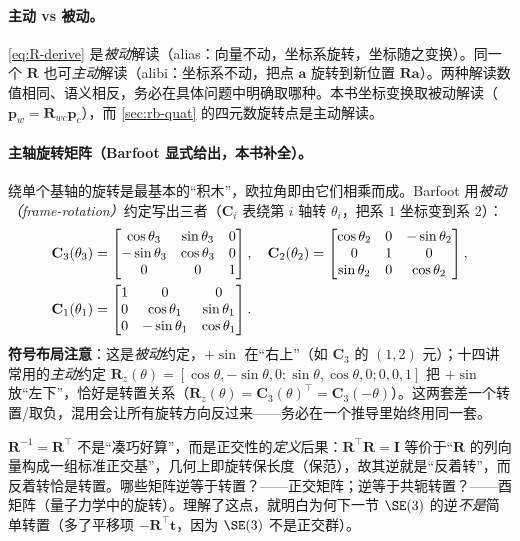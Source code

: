 \paragraph{主动 vs 被动。}\cref{eq:R-derive} 是\emph{被动}解读（alias：向量不动，坐标系旋转，坐标随之变换）。同一个 $\mathbf{R}$ 也可\emph{主动}解读（alibi：坐标系不动，把点 $\mathbf{a}$ 旋转到新位置 $\mathbf{R}\mathbf{a}$）。两种解读数值相同、语义相反，务必在具体问题中明确取哪种。本书坐标变换取被动解读（$\mathbf{p}_w=\mathbf{R}_{wc}\mathbf{p}_c$），而 \cref{sec:rb-quat} 的四元数旋转点是主动解读。

\paragraph{主轴旋转矩阵（Barfoot 显式给出，本书补全）。}绕单个基轴的旋转是最基本的“积木”，欧拉角即由它们相乘而成。Barfoot 用\emph{被动（frame-rotation）}约定写出三者\cite{barfoot2024state}（$\mathbf{C}_i$ 表绕第 $i$ 轴转 $\theta_i$，把系 $1$ 坐标变到系 $2$）：
\begin{align}
  \mathbf{C}_3(\theta_3)&=\begin{bmatrix}\cos\theta_3&\sin\theta_3&0\\-\sin\theta_3&\cos\theta_3&0\\0&0&1\end{bmatrix},\quad
  \mathbf{C}_2(\theta_2)=\begin{bmatrix}\cos\theta_2&0&-\sin\theta_2\\0&1&0\\\sin\theta_2&0&\cos\theta_2\end{bmatrix},\notag\\
  \mathbf{C}_1(\theta_1)&=\begin{bmatrix}1&0&0\\0&\cos\theta_1&\sin\theta_1\\0&-\sin\theta_1&\cos\theta_1\end{bmatrix}.
  \label{eq:rb-principal}
\end{align}
\textbf{符号布局注意}：这是\emph{被动}约定，$+\sin$ 在“右上”（如 $\mathbf{C}_3$ 的 $(1,2)$ 元）；十四讲常用的\emph{主动}约定 $\mathbf{R}_z(\theta)=[\cos\theta,-\sin\theta,0;\sin\theta,\cos\theta,0;0,0,1]$ 把 $+\sin$ 放“左下”，恰好是转置关系（$\mathbf{R}_z(\theta)=\mathbf{C}_3(\theta)^\top=\mathbf{C}_3(-\theta)$）。这两套差一个转置/取负，混用会让所有旋转方向反过来——务必在一个推导里始终用同一套。

\begin{pitfall}[概念误区：把 $\mathbf{R}^{-1}=\mathbf{R}^\top$ 当巧合]
$\mathbf{R}^{-1}=\mathbf{R}^\top$ 不是“凑巧好算”，而是正交性的\emph{定义}后果：$\mathbf{R}^\top\mathbf{R}=\mathbf{I}$ 等价于“$\mathbf{R}$ 的列向量构成一组标准正交基”，几何上即旋转保长度（保范），故其逆就是“反着转”，而反着转恰是转置。哪些矩阵逆等于转置？——正交矩阵；逆等于共轭转置？——酉矩阵（量子力学中的旋转）。理解了这点，就明白为何下一节 $\SE(3)$ 的逆\emph{不是}简单转置（多了平移项 $-\mathbf{R}^\top\mathbf{t}$，因为 $\SE(3)$ 不是正交群）。
\end{pitfall}

